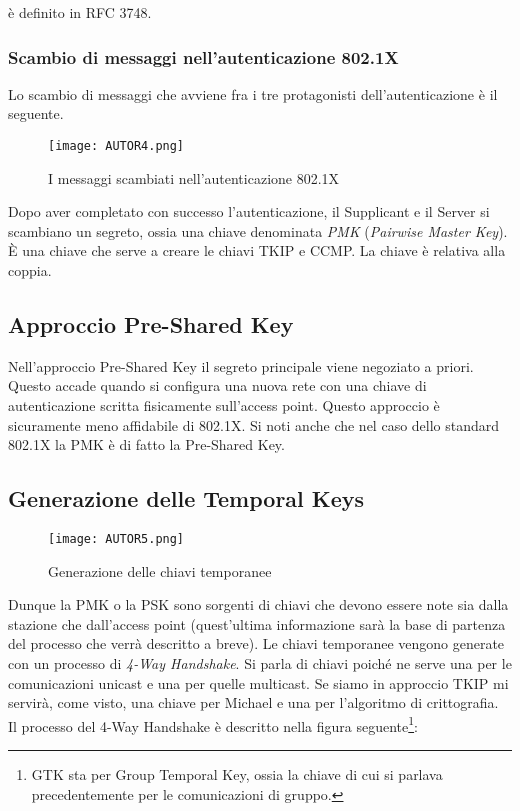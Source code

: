 \documentclass[14pt]{extreport}
\begin{document}
è definito in RFC 3748.

\subsubsection{Scambio di messaggi nell'autenticazione 802.1X}

Lo scambio di messaggi che avviene fra i tre protagonisti dell'autenticazione è il seguente.

\begin{figure}[H]
    \centering
    \texttt{[image: AUTOR4.png]}
    \caption{I messaggi scambiati nell'autenticazione 802.1X}
    \label{AUTOR4}
\end{figure}


Dopo aver completato con successo l'autenticazione, il Supplicant e il Server si scambiano un segreto, ossia una chiave denominata \textit{PMK} (\textit{Pairwise Master Key}). È una chiave che serve a creare le chiavi TKIP e CCMP. La chiave è relativa alla coppia.


\subsection{Approccio Pre-Shared Key}

Nell'approccio Pre-Shared Key il segreto principale viene negoziato a priori. Questo accade quando si configura una nuova rete con una chiave di autenticazione scritta fisicamente sull'access point. Questo approccio è sicuramente meno affidabile di 802.1X. Si noti anche che nel caso dello standard 802.1X la PMK è di fatto la Pre-Shared Key.




\subsection{Generazione delle Temporal Keys}





\begin{figure}[H]
    \centering
    \texttt{[image: AUTOR5.png]}
    \caption{Generazione delle chiavi temporanee}
    \label{AUTOR5}
\end{figure}

Dunque la PMK o la PSK sono sorgenti di chiavi che devono essere note sia dalla stazione che dall'access point (quest'ultima informazione sarà la base di partenza del processo che verrà descritto a breve).
Le chiavi temporanee vengono generate con un processo di \textit{4-Way Handshake}. Si parla di chiavi poiché ne serve una per le comunicazioni unicast e una per quelle multicast. Se siamo in approccio TKIP mi servirà, come visto, una chiave per Michael e una per l'algoritmo di crittografia.
Il processo del 4-Way Handshake è descritto nella figura seguente\footnote{GTK sta per Group Temporal Key, ossia la chiave di cui si parlava precedentemente per le comunicazioni di gruppo.}:
\end{document}
